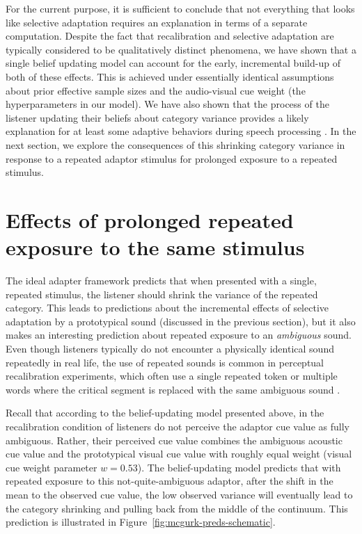 \label{r1-computation-mechanism}
For the current purpose, it is sufficient to conclude that not everything that looks like selective adaptation requires an explanation in terms of a separate computation.
Despite the fact that recalibration and selective adaptation are typically considered to be qualitatively distinct phenomena, we have shown that a single belief updating model  can account for the early, incremental build-up of both of these effects.  This is achieved under essentially identical assumptions about prior effective sample sizes and the audio-visual cue weight (the hyperparameters in our model).  We have also shown that the process of the listener updating their beliefs about category variance provides a likely explanation for at least some adaptive behaviors during speech processing \autocite[see also][]{Clayards2008}.
In the next section, we explore the consequences of this shrinking category variance in response to a repeated adaptor stimulus for prolonged exposure to a repeated stimulus.



\section{Effects of prolonged repeated exposure to the same stimulus}
\label{sec:effects-long-term}


The ideal adapter framework predicts that when presented with a single, repeated stimulus, the listener should shrink the variance of the repeated category.  This leads to predictions about the incremental effects of selective adaptation by a prototypical sound (discussed in the previous section), but it also makes an interesting prediction about repeated exposure to an \emph{ambiguous} sound.  Even though listeners typically do not encounter a physically identical sound repeatedly in real life, the use of repeated sounds is common in perceptual recalibration experiments, which often use a single repeated token \autocite[e.g.,][]{Bertelson2003,Vroomen2004} or multiple words where the critical segment is replaced with the same ambiguous sound \autocites[e.g.,][]{Norris2003,Samuel2001}[but see][]{Kraljic2005,Reinisch2014}.

Recall that according to the belief-updating model presented above, in the recalibration condition of \textcite{Vroomen2007} listeners do not perceive the adaptor cue value as fully ambiguous.  Rather, their perceived cue value combines the ambiguous acoustic cue value and the prototypical visual cue value with roughly equal weight (visual cue weight parameter $w=0.53$).  The belief-updating model predicts that with repeated exposure to this not-quite-ambiguous adaptor, after the shift in the mean to the observed cue value, the low observed variance will eventually lead to the category shrinking and pulling back from the middle of the continuum. This prediction is illustrated in Figure~\ref{fig:mcgurk-preds-schematic}.

